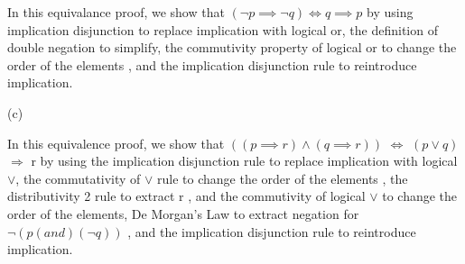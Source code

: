 \documentclass[a4paper,10pt,fleqn]{article}
\begin{document}
\setlength{\leftskip}{\dimexpr\parindent+2em\relax}
\noindent In this equivalance proof, we show that $(\lnot p \implies \lnot q) \iff q \implies p$ by using implication disjunction to replace implication with logical or, the definition of double negation to simplify, the commutivity property of logical or to change the order of the elements \citep[Slide 27]{simpson25a}, and the implication disjunction rule to reintroduce implication.

\bigskip

\setlength{\leftskip}{0pt}
\medskip

\noindent\hspace*{\parindent}(c) \begin{center}
\end{center}
\bigskip


\bigskip

\setlength{\leftskip}{\dimexpr\parindent+2em\relax}
\noindent In this equivalence proof, we show that $((p \implies r) \land (q \implies r))$ $\Leftrightarrow$ $(p \lor q)$ $\Rightarrow$ r by using the implication disjunction rule to replace implication with logical $\lor$, the commutativity of $\lor$ rule to change the order of the elements \citep[Slide 27]{simpson25a}, the distributivity 2 rule to extract r \citep[Slide 29]{simpson25a}, and the commutivity of logical $\lor$ to change the order of the elements, De Morgan's Law to extract negation for $\lnot (p(and)(\lnot q))$ \citep[Slide 28]{simpson25a}, and the implication disjunction rule to reintroduce implication.

\bigskip
\end{document}
